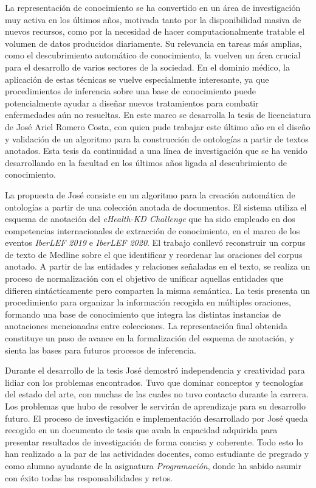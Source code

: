 
\begin{opinion}
	La representación de conocimiento se ha convertido en un área de investigación muy activa en los últimos años, motivada tanto por la disponibilidad masiva de nuevos recursos, como por la necesidad de hacer computacionalmente tratable el volumen de datos producidos diariamente. Su relevancia en tareas más amplias, como el descubrimiento automático de conocimiento, la vuelven un área crucial para el desarrollo de varios sectores de la sociedad. En el dominio médico, la aplicación de estas técnicas se vuelve especialmente interesante, ya que procedimientos de inferencia sobre una base de conocimiento puede potencialmente ayudar a diseñar nuevos tratamientos para combatir enfermedades aún no resueltas. En este marco se desarrolla la tesis de licenciatura de José Ariel Romero Costa, con quien pude trabajar este último año en el diseño y validación de un algoritmo para la construcción de ontologías a partir de textos anotados. Esta tesis da continuidad a una línea de investigación que se ha venido desarrollando en la facultad en los últimos años ligada al descubrimiento de conocimiento.

	La propuesta de José consiste en un algoritmo para la creación automática de ontologías a partir de una colección anotada de documentos. El sistema utiliza el esquema de anotación del \emph{eHealth-KD Challenge} que ha sido empleado en dos competencias internacionales de extracción de conocimiento, en el marco de los eventos \emph{IberLEF 2019} e \emph{IberLEF 2020}. El trabajo conllevó reconstruir un corpus de texto de Medline sobre el que identificar y reordenar las oraciones del corpus anotado. A partir de las entidades y relaciones señaladas en el texto, se realiza un proceso de normalización con el objetivo de unificar aquellas entidades que difieren sintácticamente pero comparten la misma semántica. La tesis presenta un procedimiento para organizar la información recogida en múltiples oraciones, formando una base de conocimiento que integra las distintas instancias de anotaciones mencionadas entre colecciones. La representación final obtenida constituye un paso de avance en la formalización del esquema de anotación, y sienta las bases para futuros procesos de inferencia.

	Durante el desarrollo de la tesis José demostró independencia y creatividad para lidiar con los problemas encontrados. Tuvo que dominar conceptos y tecnologías del estado del arte, con muchas de las cuales no tuvo contacto durante la carrera. Los problemas que hubo de resolver le servirán de aprendizaje para su desarrollo futuro. El proceso de investigación e implementación desarrollado por José queda recogido en un documento de tesis que avala la capacidad adquirida para presentar resultados de investigación de forma concisa y coherente. Todo esto lo han realizado a la par de las actividades docentes, como estudiante de pregrado y como alumno ayudante de la asignatura \emph{Programación}, donde ha sabido asumir con éxito todas las responsabilidades y retos.


\end{opinion}

